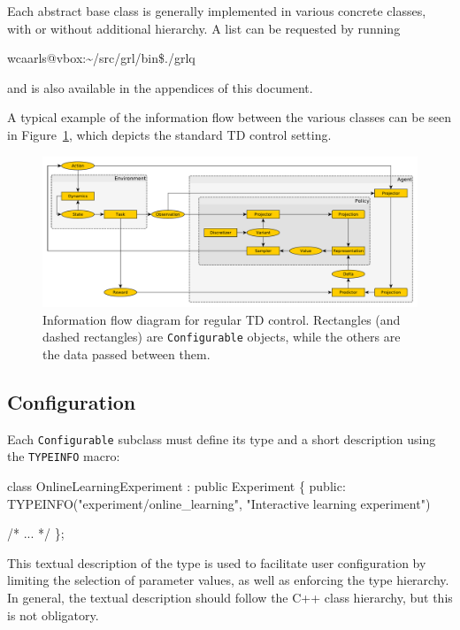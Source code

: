 \documentclass{article}
\makeatletter
\newcommand{\txt}[1]{\texttt{#1}}
\newcommand{\promptmn}{wcaarls@vbox:\~{}/src/grl/bin\$\xspace}
\newenvironment{code}{\alltt}{\endalltt}
\makeatother
\begin{document}
Each abstract base class is generally implemented in various concrete
classes, with or without additional hierarchy. A list can be requested by
running 

\begin{code}
\promptmn ./grlq
\end{code}

and is also available in the appendices of this document.

A typical example of the information flow between the various classes can be seen in Figure~\ref{fig:td},
which depicts the standard TD control setting.

\begin{figure}
\includegraphics[width=\linewidth]{td.pdf}
\caption{Information flow diagram for regular TD control. Rectangles (and
dashed rectangles) are \txt{Configurable} objects, while the others are the
data passed between them.}
\label{fig:td}
\end{figure}

\subsection{Configuration}

Each \txt{Configurable} subclass must define its type and a short
description using the \txt{TYPEINFO} macro:

\begin{code}
class OnlineLearningExperiment : public Experiment
\{
  public:
    TYPEINFO("experiment/online_learning", "Interactive learning experiment")
  
  /* ... */
\};
\end{code}

This textual description of the type is used to facilitate user
configuration by limiting the selection of parameter values, as well as enforcing the type
hierarchy. In general, the textual description should follow the C++ class
hierarchy, but this is not obligatory.
\end{document}
